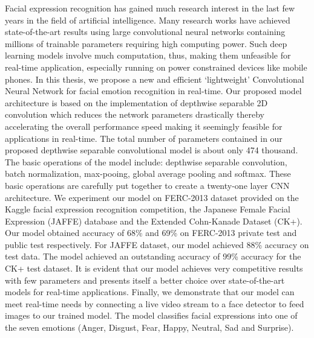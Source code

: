 \documentclass[master]{thesis-uestc}
\begin{document}
\begin{englishabstract}
Facial expression recognition has gained much research interest in the last few years in the field of artificial intelligence. Many research works have achieved state-of-the-art results using large convolutional neural networks containing millions of trainable parameters requiring high computing power. Such deep learning models involve much computation, thus, making them unfeasible for real-time application, especially running on power constrained devices like mobile phones. In this thesis, we propose a new and efficient `lightweight' Convolutional Neural Network for facial emotion recognition in real-time. Our proposed model architecture is based on the implementation of depthwise separable 2D convolution which reduces the network parameters drastically thereby accelerating the overall performance speed making it seemingly feasible for applications in real-time. The total number of parameters contained in our proposed depthwise separable convolutional model is about only 474 thousand. The basic operations of the model include: depthwise separable convolution, batch normalization, max-pooing, global average pooling and softmax. These basic operations are carefully put together to create a twenty-one layer CNN architecture. We experiment our model on FERC-2013 dataset provided on the Kaggle facial expression recognition competition, the Japanese Female Facial Expression (JAFFE) database and the Extended Cohn-Kanade Dataset (CK+). Our model obtained accuracy of 68\% and 69\% on FERC-2013 private test and public test respectively. For JAFFE dataset, our model achieved 88\% accuracy on test data. The model achieved an outstanding accuracy of 99\% accuracy for the CK+ test dataset. It is evident that our model achieves very competitive results with few parameters and presents itself a better choice over state-of-the-art models for real-time applications. Finally, we demonstrate that our model can meet real-time needs by connecting a live video stream to a face detector to feed images to our trained model. The model classifies facial expressions into one of the seven emotions (Anger, Disgust, Fear, Happy, Neutral, Sad and Surprise).


\end{englishabstract}

\thesistableofcontents

\thesischapterexordium
\end{document}
